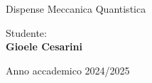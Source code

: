\begin{titlepage}
    \begin{center}
    
	\vspace*{2cm}

        \LARGE

       	Dispense Meccanica Quantistica

        \normalsize
        \vspace*{8cm}

        \hfill
        \begin{minipage}[t]{0.47\textwidth}\raggedleft
	       {Studente:} \hspace{-0.9em} \vspace{0.3em} \\
              {\large \textbf{Gioele Cesarini}} 
        \end{minipage}

        \vspace*{2cm}
        \vfill
        Anno accademico 2024/2025
            
    \end{center}
\end{titlepage}



\tableofcontents
